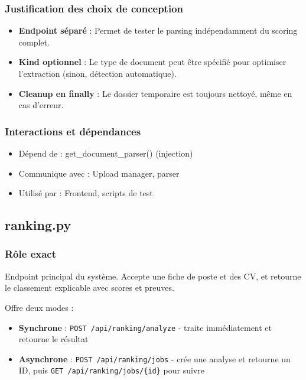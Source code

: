 \documentclass[12pt,a4paper,oneside]{book}
\begin{document}
\subsubsection{Justification des choix de conception}

\begin{itemize}
    \item \textbf{Endpoint séparé} : Permet de tester le parsing indépendamment du scoring complet.
    
    \item \textbf{Kind optionnel} : Le type de document peut être spécifié pour optimiser l'extraction (sinon, détection automatique).
    
    \item \textbf{Cleanup en finally} : Le dossier temporaire est toujours nettoyé, même en cas d'erreur.
\end{itemize}

\subsubsection{Interactions et dépendances}

\begin{itemize}
    \item Dépend de : get\_document\_parser() (injection)
    \item Communique avec : Upload manager, parser
    \item Utilisé par : Frontend, scripts de test
\end{itemize}

\subsection{ranking.py}

\subsubsection{Rôle exact}

Endpoint principal du système. Accepte une fiche de poste et des CV, et retourne le classement explicable avec scores et preuves.

Offre deux modes :
\begin{itemize}
    \item \textbf{Synchrone} : \texttt{POST /api/ranking/analyze} - traite immédiatement et retourne le résultat
    \item \textbf{Asynchrone} : \texttt{POST /api/ranking/jobs} - crée une analyse et retourne un ID, puis \texttt{GET /api/ranking/jobs/\{id\}} pour suivre
\end{itemize}
\end{document}
